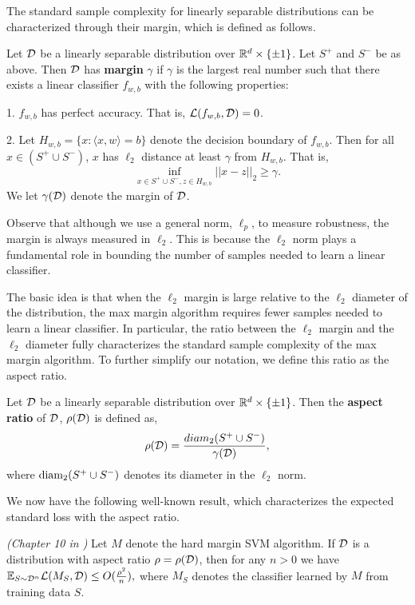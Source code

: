 The standard sample complexity for linearly separable distributions can be characterized through their margin, which is defined as follows.

\begin{defn}\label{defn:margin}
Let ${\mathcal D}$ be a linearly separable distribution over $\mathbb R^d \times \{\pm 1\}$. Let $S^+$ and $S^-$ be as above. Then ${\mathcal D}$ has \textbf{margin} $\gamma$ if $\gamma$ is the largest real number such that there exists a linear classifier $f_{w,b}$ with the following properties:

1. $f_{w,b}$ has perfect accuracy. That is, $\mathcal L(f_{w,b}, {\mathcal D}) = 0$.

2. Let $H_{w,b} = \{x: \langle x, w \rangle = b\}$ denote the decision boundary of $f_{w,b}$. Then for all $x \in (S^+ \cup S^-)$, $x$ has $\ell_2$ distance at least $\gamma$ from $H_{w,b}$. That is, $$\inf_{x \in S^+ \cup S^-, z \in H_{w,b}} ||x - z||_2 \geq \gamma.$$ We let $\gamma({\mathcal D})$ denote the margin of ${\mathcal D}$.
\end{defn}

Observe that although we use a general norm, $\ell_p$, to measure robustness, the margin is always measured in $\ell_2$. This is because the $\ell_2$ norm plays a fundamental role in  bounding the number of samples needed to learn a linear classifier. 

The basic idea is that when the $\ell_2$ margin is large relative to the $\ell_2$ diameter of the distribution, the max margin algorithm requires fewer samples needed to learn a linear classifier. In particular, the ratio between the $\ell_2$ margin and the $\ell_2$ diameter fully characterizes the standard sample complexity of the max margin algorithm. To further simplify our notation, we define this ratio as the aspect ratio.

\begin{defn}\label{defn:aspect_ratio}
Let ${\mathcal D}$ be a linearly separable distribution over $\mathbb R^d \times \{\pm 1\}$. Then the \textbf{aspect ratio} of ${\mathcal D}$, $\rho({\mathcal D})$ is defined as, $$\rho({\mathcal D}) = \frac{diam_2(S^+ \cup S^-)}{\gamma({\mathcal D})},$$ where $\text{diam}_2(S^+ \cup S^-)$ denotes its diameter in the $\ell_2$ norm.
\end{defn}

We now have the following well-known result, which characterizes the expected standard loss with the aspect ratio.
\begin{thm}\label{thm:standard}
\emph{(Chapter 10 in \cite{vapnik1998})} Let $M$ denote the hard margin SVM algorithm. If ${\mathcal D}$ is a distribution with aspect ratio $\rho = \rho({\mathcal D})$, then for any $n > 0$ we have ${\mathbb E}_{S \sim {\mathcal D}^n}\mathcal L(M_S, {\mathcal D}) \leq O(\frac{\rho^2}{n}),$ where $M_S$ denotes the classifier learned by $M$ from training data $S$. 
\end{thm}

